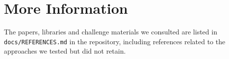 \documentclass[10pt,a4paper]{article}
\begin{document}
\section{More Information}
The papers, libraries and challenge materials we consulted are listed in \texttt{docs/REFERENCES.md} in the repository, including references related to the approaches we tested but did not retain.
\end{document}
